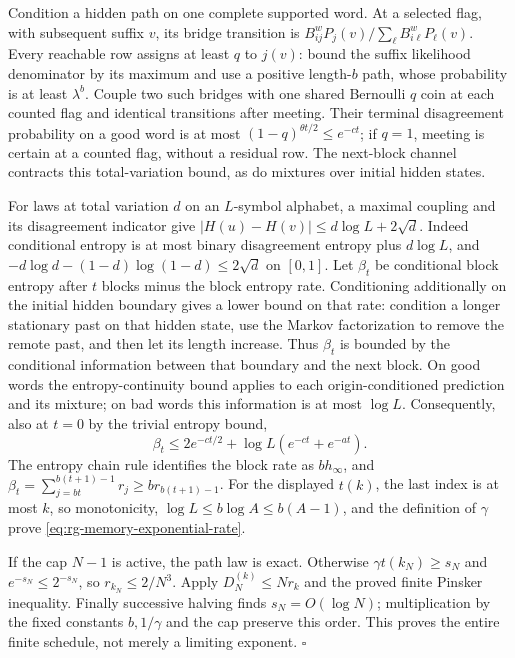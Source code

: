 Condition a hidden path on one complete supported word. At a selected flag,
with subsequent suffix \(v\), its bridge transition is
\(B^{w}_{ij}P_j(v)/\sum_\ell B^w_{i\ell}P_\ell(v)\).
Every reachable row assigns at least \(q\) to \(j(v)\): bound the
suffix likelihood denominator by its maximum and use a positive length-\(b\)
path, whose probability is at least \(\lambda^b\). Couple two such
bridges with one shared Bernoulli \(q\) coin at each counted flag and
identical transitions after meeting. Their terminal disagreement probability
on a good word is at most
\((1-q)^{\theta t/2}\leq e^{-ct}\); if \(q=1\), meeting is certain
at a counted flag, without a residual row. The next-block channel contracts
this total-variation bound, as do mixtures over initial hidden states.

For laws at total variation \(d\) on an \(L\)-symbol alphabet, a
maximal coupling and its disagreement indicator give
\(|H(u)-H(v)|\leq d\log L+2\sqrt d\). Indeed conditional entropy is
at most binary disagreement entropy plus \(d\log L\), and
\(-d\log d-(1-d)\log(1-d)\leq2\sqrt d\) on \([0,1]\).
Let \(\beta_t\) be conditional block entropy after \(t\) blocks minus
the block entropy rate. Conditioning additionally on the initial hidden
boundary gives a lower bound on that rate: condition a longer stationary
past on that hidden state, use the Markov factorization to remove the remote
past, and then let its length increase. Thus \(\beta_t\) is bounded
by the conditional information between that boundary and the next block.
On good words the entropy-continuity bound applies to each origin-conditioned
prediction and its mixture; on bad words this information is at most
\(\log L\). Consequently, also at \(t=0\) by the trivial entropy bound,
\begin{equation}
 \beta_t\leq2e^{-ct/2}+\log L(e^{-ct}+e^{-at}).
\label{eq:rg-memory-block-excess}
\end{equation}
The entropy chain rule identifies the block rate as \(bh_\infty\), and
\(\beta_t=\sum_{j=bt}^{b(t+1)-1}r_j\geq br_{b(t+1)-1}\).
For the displayed \(t(k)\), the last index is at most \(k\), so
monotonicity, \(\log L\leq b\log A\leq b(A-1)\), and the definition
of \(\gamma\) prove \cref{eq:rg-memory-exponential-rate}.

If the cap \(N-1\) is active, the path law is exact. Otherwise
\(\gamma t(k_N)\geq s_N\) and \(e^{-s_N}\leq2^{-s_N}\), so
\(r_{k_N}\leq2/N^3\). Apply \(D_N^{(k)}\leq Nr_k\) and the proved
finite Pinsker inequality. Finally successive halving finds
\(s_N=O(\log N)\); multiplication by the fixed constants \(b,1/\gamma\)
and the cap preserve this order. This proves the entire finite schedule,
not merely a limiting exponent. \(\square\)

